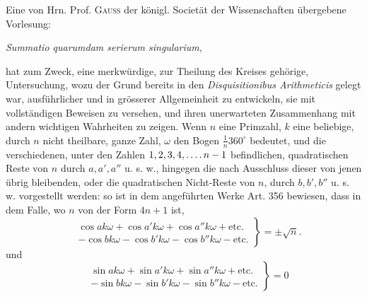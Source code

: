 Eine von Hrn. Prof. \textsc{Gauss} der königl. Societät der Wissenschaften übergebene Vorlesung:
\begin{center}\emph{Summatio quarumdam serierum singularium},\end{center}
hat zum Zweck, eine merkwürdige, zur Theilung des Kreises gehörige, Untersuchung, wozu der Grund bereits in den \emph{Disquisitionibus Arithmeticis} gelegt war, ausführlicher und in grösserer Allgemeinheit zu entwickeln, sie mit vollständigen Beweisen zu versehen, und ihren unerwarteten Zusammenhang mit andern wichtigen Wahrheiten zu zeigen. Wenn $n$ eine Primzahl, $k$ eine beliebige, durch $n$ nicht theilbare, ganze Zahl, $\omega$ den Bogen $\frac1n360^\circ$ bedeutet, und die verschiedenen, unter den Zahlen $1,2,3,4,\mathinner{.\,.\,.\,.} n-1$ befindlichen, quadratischen Reste von $n$ durch $a,a',a''$ u. s. w., hingegen die nach Ausschluss dieser von jenen übrig bleibenden, oder die quadratischen Nicht-Reste von $n$, durch $b,b',b''$ u. s. w. vorgestellt werden: so ist in dem angeführten Werke Art. 356 bewiesen, dass in dem Falle, wo $n$ von der Form $4n+1$ ist,
\[
\left.\begin{aligned}
&\cos ak\omega+\cos a'k\omega+\cos a''k\omega+\text{etc.}\\
&-\cos bk\omega-\cos b'k\omega-\cos b''k\omega-\text{etc.}
\end{aligned}\right\}=\pm\surd n.
\]
und
\[
\left.\begin{aligned}
&\sin ak\omega+\sin a'k\omega+\sin a''k\omega+\text{etc.}\\
&-\sin bk\omega-\sin b'k\omega-\sin b''k\omega-\text{etc.}
\end{aligned}\right\}=0
\]

